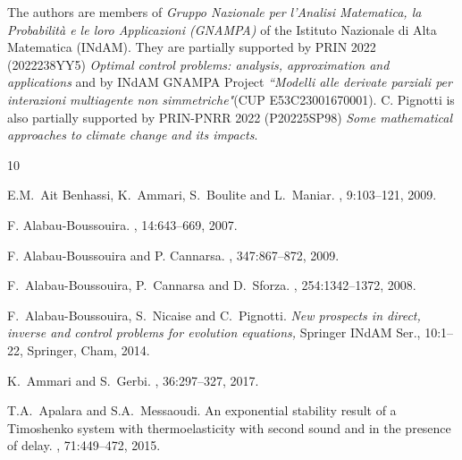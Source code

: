 \documentclass[11pt]{article}
\begin{document}
\bigskip
{} The authors are members of  {\it Gruppo Nazionale per l'Analisi Ma\-te\-matica, la Probabilit\`a e le loro Applicazioni (GNAMPA)} of the Istituto Nazionale di Alta Matematica (INdAM).
They  are partially supported by PRIN 2022  (2022238YY5) {\it Optimal control problems: analysis,
approximation and applications} and by INdAM GNAMPA Project {\it ``Modelli alle derivate parziali per interazioni multiagente non 
simmetriche"}(CUP E53C23001670001). 
C. Pignotti is also partially supported by
PRIN-PNRR 2022 (P20225SP98) {\it Some mathematical approaches to climate change and its impacts}. 



\begin{thebibliography}{10}

{\sc E.M.~Ait Benhassi, K.~Ammari, S.~Boulite and L.~Maniar.}
, 9:103--121, 2009.

{\sc F. Alabau-Boussouira.}
, 14:643--669, 2007.

{\sc F. Alabau-Boussouira and P. Cannarsa.}
, 347:867--872, 2009.
 

{\sc F.~Alabau-Boussouira, P.~Cannarsa and D.~Sforza.}
, 254:1342--1372, 2008.

{\sc F.~Alabau-Boussouira, S.~Nicaise and C.~Pignotti}.
 {\em New prospects in direct, inverse and control problems for evolution equations,} Springer INdAM Ser., 10:1--22, Springer, Cham, 2014.

{\sc K.~Ammari and S.~Gerbi.}
, 36:297--327, 2017.

{\sc T.A.~Apalara and S.A.~Messaoudi.}
\newblock An exponential stability result of a Timoshenko system with thermoelasticity with second sound and in the presence of delay.
, 71:449--472, 2015.




\end{thebibliography}
\end{document}
